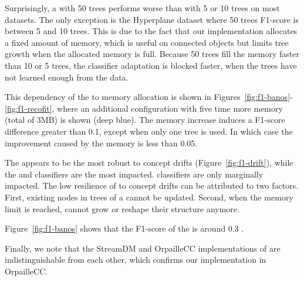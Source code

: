 Surprisingly, a \mondrianforest with 50 trees performs worse than with 5 or 10
trees on most datasets. The only exception is the Hyperplane dataset where
50 trees F1-score is between 5 and 10 trees. This is due to the fact that
our \mondrianforest implementation allocates a fixed amount of memory, which is
useful on connected objects but limits tree growth when the allocated memory is
full. Because 50 trees fill the memory faster than 10 or 5 trees, the
classifier adaptation is blocked faster, when the trees have not learned enough
from the data.

This dependency of the \mondrianforest to memory allocation is shown in
Figures~\ref{fig:f1-banos}-\ref{fig:f1-recofit}, where an additional
configuration with five time more memory (total of 3MB) is shown (deep blue).  The memory
increase induces a F1-score difference greater than 0.1, except when only one
tree is used. In which case the improvement caused by the memory is less than
0.05.

The \hoeffdingtree appears to be the most robust to concept drifts
(Figure~\ref{fig:f1-drift}), while the \mondrianforest and \naivebayes
classifiers are the most impacted. \mcnn classifiers are only marginally impacted.
The low resilience of \mondrianforest to concept drifts can be attributed to
two factors. First, existing nodes in trees of a \mondrianforest cannot be updated.
Second, when the memory limit is reached, \mondrianforest cannot grow
or reshape their structure anymore.

Figure~\ref{fig:f1-banos} shows that the F1-score of the \FNN
is around 0.3 . 

Finally, we note that the StreamDM and OrpailleCC implementations of
\naivebayes are indistinguishable from each other, which confirms our
implementation in OrpailleCC.

